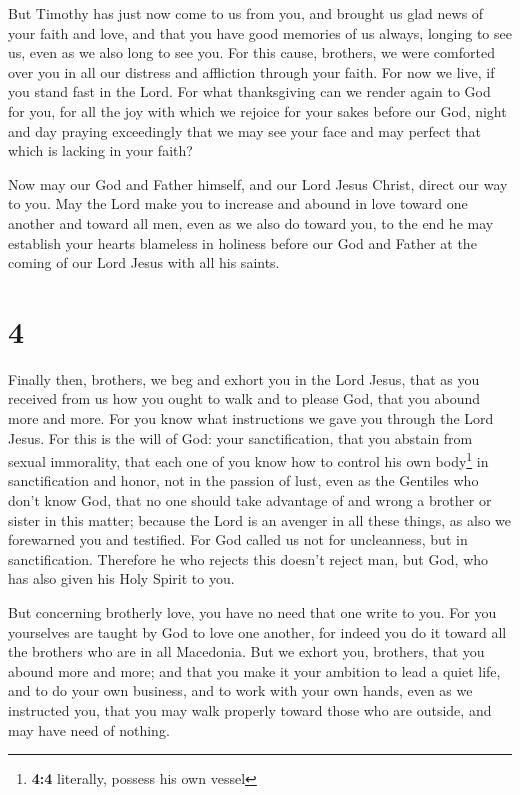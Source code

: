  But Timothy has just now come to us from you, and brought
us glad news of your faith and love, and that you have good memories of
us always, longing to see us, even as we also long to see you.
 For this cause, brothers, we were comforted over you in
all our distress and affliction through your faith.  For
now we live, if you stand fast in the Lord.  For what
thanksgiving can we render again to God for you, for all the joy with
which we rejoice for your sakes before our God,  night
and day praying exceedingly that we may see your face and may perfect
that which is lacking in your faith?

 Now may our God and Father himself, and our Lord Jesus
Christ, direct our way to you.  May the Lord make you to
increase and abound in love toward one another and toward all men, even
as we also do toward you,  to the end he may establish
your hearts blameless in holiness before our God and Father at the
coming of our Lord Jesus with all his saints.

\hypertarget{section-3}{%
\section{4}\label{section-3}}

 Finally then, brothers, we beg and exhort you in the Lord
Jesus, that as you received from us how you ought to walk and to please
God, that you abound more and more.  For you know what
instructions we gave you through the Lord Jesus.  For this
is the will of God: your sanctification, that you abstain from sexual
immorality,  that each one of you know how to control his
own body\footnote{\textbf{4:4} literally, possess his own vessel} in
sanctification and honor,  not in the passion of lust,
even as the Gentiles who don't know God,  that no one
should take advantage of and wrong a brother or sister in this matter;
because the Lord is an avenger in all these things, as also we
forewarned you and testified.  For God called us not for
uncleanness, but in sanctification.  Therefore he who
rejects this doesn't reject man, but God, who has also given his Holy
Spirit to you.

 But concerning brotherly love, you have no need that one
write to you. For you yourselves are taught by God to love one another,
 for indeed you do it toward all the brothers who are in
all Macedonia. But we exhort you, brothers, that you abound more and
more;  and that you make it your ambition to lead a quiet
life, and to do your own business, and to work with your own hands, even
as we instructed you,  that you may walk properly toward
those who are outside, and may have need of nothing.

